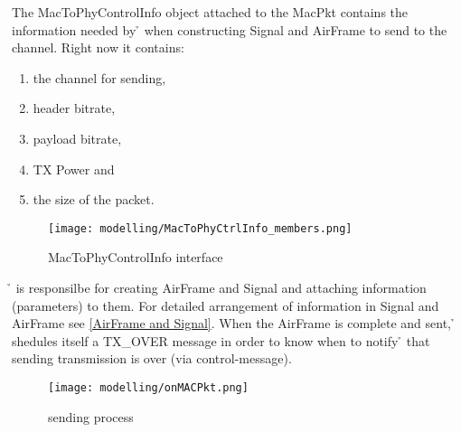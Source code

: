 The MacToPhyControlInfo object attached to the MacPkt contains the information needed
by \h{\bp} when constructing Signal and AirFrame to send to the channel. Right now it contains:

\begin{enumerate}
	\item the channel for sending,
	\item header bitrate,
	\item payload bitrate,
	\item TX Power and
	\item the size of the packet.

\end{enumerate}



\begin{figure}[H]
 \centering
 \texttt{[image: modelling/MacToPhyCtrlInfo\_members.png]}
 \caption{MacToPhyControlInfo interface}
 \label{fig: MacToPhyCtrlInfo interface}
\end{figure}

\h{\bp} is responsilbe for creating AirFrame and Signal and attaching information (parameters) to them. For detailed arrangement of information in Signal and AirFrame see \ref{AirFrame and Signal}.
When the AirFrame is complete and sent, \h{\bp} shedules itself a TX\_OVER message
in order to know when to notify \h{\bm} that sending transmission is over (via control-message).

\begin{figure}[H]
 \centering
 \texttt{[image: modelling/onMACPkt.png]}
 \caption{sending process}
 \label{fig: sending process}
\end{figure}






